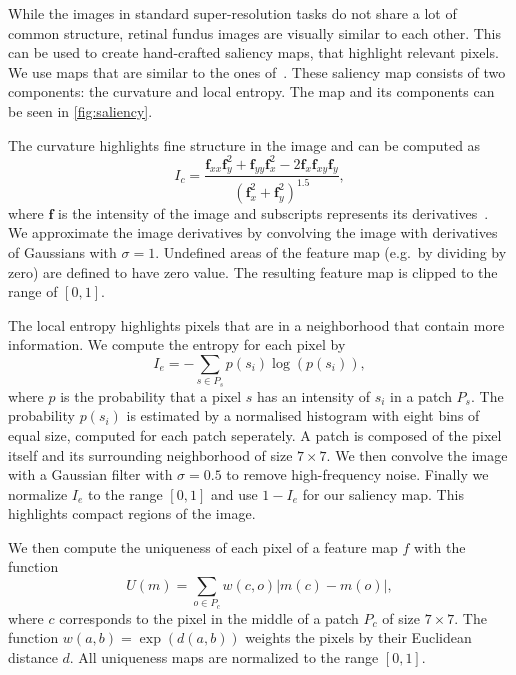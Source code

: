 \documentclass{scrartcl}
\newcommand{\img}{\bm{f}} %
\begin{document}
While the images in standard super-resolution tasks do not share a lot of common structure, retinal fundus images are visually similar to each other.
This can be used to create hand-crafted saliency maps, that highlight relevant pixels.
We use maps that are similar to the ones of~\cite{SaliencyGAN}.
These saliency map consists of two components: the curvature and local entropy.
The map and its components can be seen in \cref{fig:saliency}.

The curvature highlights fine structure in the image and can be computed as
\begin{equation}
 I_c = \frac{\img_{xx} \img_y^2 + \img_{yy} \img_x^2 - 2 \img_{x} \img_{xy} \img_{y} }{(\img_x^2 + \img_y^2)^{1.5}},
\end{equation}
where \(\img\) is the intensity of the image and subscripts represents its derivatives~\cite{SaliencyGAN}.
We approximate the image derivatives by convolving the image with derivatives of Gaussians with \(\sigma = 1\).
Undefined areas of the feature map (e.g.\ by dividing by zero) are defined to have zero value.
The resulting feature map is clipped to the range of $[0,1]$.

The local entropy highlights pixels that are in a neighborhood that contain more information.
We compute the entropy for each pixel by
\begin{equation}
  \label{eq:entr}
  I_e = - \sum_{s \in P_s} p(s_i) \log(p(s_i)),
\end{equation}
where \(p\) is the probability that a pixel \(s\) has an intensity of \(s_i\) in a patch \(P_s\).
The probability $p(s_i)$ is estimated by a normalised histogram with eight bins of equal size, computed for each patch seperately.
A patch is composed of the pixel itself and its surrounding neighborhood of size \(7 \times 7\).
We then convolve the image with a Gaussian filter with \(\sigma = 0.5\) to remove high-frequency noise.
Finally we normalize $I_e$ to the range \([0, 1]\) and use $1 - I_e$ for our saliency map.
This highlights compact regions of the image.

We then compute the uniqueness of each pixel of a feature map \(f\) with the function
\begin{equation}
  \label{eq:uniq}
  U(m) = \sum_{o \in P_c} w(c, o) \vert m(c) - m(o) \vert,
\end{equation}
where \(c\) corresponds to the pixel in the middle of a patch \(P_c\) of size \(7 \times 7\).
The function \(w(a,b) = \exp(d(a, b))\) weights the pixels by their Euclidean distance \(d\).
All uniqueness maps are normalized to the range \([0,1]\).
\end{document}
